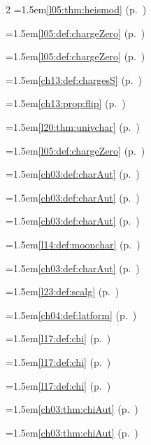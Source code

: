 \begin{multicols}{2}
\hangindent=1.5em\quad \ref{l05:thm:heismod} (p.~\pageref{l05:thm:heismod})\par
\hangindent=1.5em\quad \ref{l05:def:chargeZero} (p.~\pageref{l05:def:chargeZero})\par
\hangindent=1.5em\quad \ref{l05:def:chargeZero} (p.~\pageref{l05:def:chargeZero})\par
\hangindent=1.5em\quad \ref{ch13:def:chargesS} (p.~\pageref{ch13:def:chargesS})\par
\hangindent=1.5em\quad \ref{ch13:prop:flip} (p.~\pageref{ch13:prop:flip})\par
\hangindent=1.5em\quad \ref{l20:thm:univchar} (p.~\pageref{l20:thm:univchar})\par
\hangindent=1.5em\quad \ref{l05:def:chargeZero} (p.~\pageref{l05:def:chargeZero})\par
\hangindent=1.5em\quad \ref{ch03:def:charAut} (p.~\pageref{ch03:def:charAut})\par
\hangindent=1.5em\quad \ref{ch03:def:charAut} (p.~\pageref{ch03:def:charAut})\par
\hangindent=1.5em\quad \ref{ch03:def:charAut} (p.~\pageref{ch03:def:charAut})\par
\hangindent=1.5em\quad \ref{l14:def:moonchar} (p.~\pageref{l14:def:moonchar})\par
\hangindent=1.5em\quad \ref{ch03:def:charAut} (p.~\pageref{ch03:def:charAut})\par
\hangindent=1.5em\quad \ref{l23:def:scalg} (p.~\pageref{l23:def:scalg})\par
\hangindent=1.5em\quad \ref{ch04:def:latform} (p.~\pageref{ch04:def:latform})\par
\hangindent=1.5em\quad \ref{l17:def:chi} (p.~\pageref{l17:def:chi})\par
\hangindent=1.5em\quad \ref{l17:def:chi} (p.~\pageref{l17:def:chi})\par
\hangindent=1.5em\quad \ref{l17:def:chi} (p.~\pageref{l17:def:chi})\par
\hangindent=1.5em\quad \ref{ch03:thm:chiAut} (p.~\pageref{ch03:thm:chiAut})\par
\hangindent=1.5em\quad \ref{ch03:thm:chiAut} (p.~\pageref{ch03:thm:chiAut})\par

\end{multicols}
